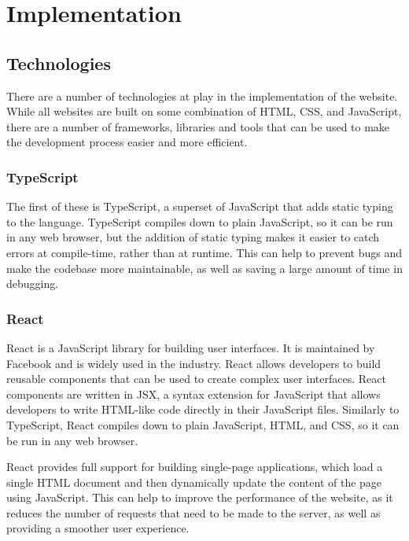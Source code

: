 \documentclass[../main.tex]{subfiles}
\begin{document}
    \section{Implementation}
        \subsection{Technologies}
            There are a number of technologies at play in the implementation of the
                website.
            While all websites are built on some combination of HTML, CSS, and JavaScript,
                there are a number of frameworks, libraries and tools that can be used to make
                the development process easier and more efficient.

            \subsubsection{TypeScript}
                The first of these is TypeScript, a superset of JavaScript that adds static
                    typing to the language.
                TypeScript compiles down to plain JavaScript, so it can be run in any web
                    browser, but the addition of static typing makes it easier to catch errors at
                    compile-time, rather than at runtime.
                This can help to prevent bugs and make the codebase more maintainable, as well
                    as saving a large amount of time in debugging.

            \subsubsection{React}
                React is a JavaScript library for building user interfaces.
                It is maintained by Facebook and is widely used in the industry.
                React allows developers to build reusable components that can be used to create
                    complex user interfaces.
                React components are written in JSX, a syntax extension for JavaScript that
                    allows developers to write HTML-like code directly in their JavaScript files.
                Similarly to TypeScript, React compiles down to plain JavaScript, HTML, and
                    CSS, so it can be run in any web browser.

                React provides full support for building single-page applications, which load a
                    single HTML document and then dynamically update the content of the page using
                    JavaScript.
                This can help to improve the performance of the website, as it reduces the
                    number of requests that need to be made to the server, as well as providing a
                    smoother user experience.
\end{document}
